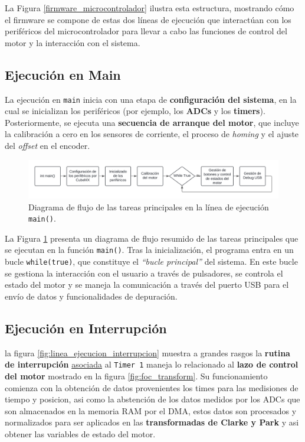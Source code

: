 \documentclass[11pt]{report}
\begin{document}
La Figura \ref{firmware_microcontrolador} ilustra esta estructura, mostrando cómo el firmware se compone de estas dos líneas de ejecución que interactúan con los periféricos del microcontrolador para llevar a cabo las funciones de control del motor y la interacción con el sistema.


\subsection{Ejecución en Main}

La ejecución en \texttt{main} inicia con una etapa de \textbf{configuración del sistema}, en la cual se inicializan los periféricos (por ejemplo, los \textbf{ADCs} y los \textbf{timers}). Posteriormente, se ejecuta una \textbf{secuencia de arranque del motor}, que incluye la calibración a cero en los sensores de corriente, el proceso de \emph{homing} y el ajuste del \emph{offset} en el encoder.

\begin{figure}[ht]
	\centering
	\includegraphics[width=\textwidth]{imagenes/Diagramas/linea main.png}
	\caption{Diagrama de flujo de las tareas principales en la línea de ejecución \texttt{main()}.}
	\label{fig:linea_ejecucion_main}
\end{figure}
\FloatBarrier

La Figura \ref{fig:linea_ejecucion_main} presenta un diagrama de flujo resumido de las tareas principales que se ejecutan en la función \texttt{main()}. Tras la inicialización, el programa entra en un bucle \texttt{while(true)}, que constituye el \emph{``bucle principal''} del sistema. En este bucle se gestiona la interacción con el usuario a través de pulsadores, se controla el estado del motor y se maneja la comunicación a través del puerto USB para el envío de datos y funcionalidades de depuración.

\subsection{Ejecución en Interrupción}

la figura \ref{fig:linea_ejecucion_interrupcion} muestra a grandes rasgos la \textbf{rutina de interrupción} \href{https://www.youtube.com/watch?v=RJX_jYm8T84}{asociada} al \texttt{Timer 1} maneja lo relacionado al \textbf{lazo de control del motor} mostrado en la figura \ref{fig:foc_transform}. Su funcionamiento comienza con la obtención de datos provenientes los times para las medisiones de tiempo y posicion, asi como la abstención de los datos medidos por los ADCs que son almacenados en la memoria RAM por el DMA, estos datos son procesados y normalizados para ser aplicados en las \textbf{transformadas de Clarke y Park} y asi obtener las variables de estado del motor.
\end{document}
